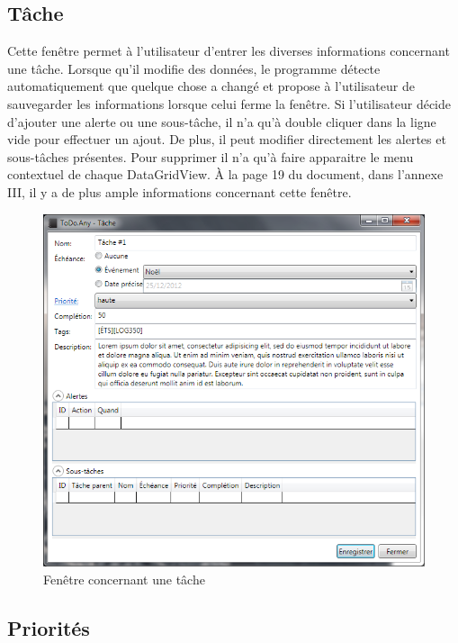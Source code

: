 \documentclass[letterpaper, oneside, 12pt, these, creativecommons]{thETS}
\begin{document}
\newpage

\subsection{Tâche}

Cette fenêtre permet à l'utilisateur d'entrer les diverses informations concernant une tâche. Lorsque qu'il modifie des données, le programme détecte automatiquement que quelque chose a changé et propose à l'utilisateur de sauvegarder les informations lorsque celui ferme la fenêtre. Si l'utilisateur décide d'ajouter une alerte ou une sous-tâche, il n'a qu'à double cliquer dans la ligne vide pour effectuer un ajout. De plus, il peut modifier directement les alertes et sous-tâches présentes. Pour supprimer il n'a qu'à faire apparaitre le menu contextuel de chaque DataGridView. À la page 19 du document, dans l'annexe III, il y a de plus ample informations concernant cette fenêtre.

\begin{figure}[H!]
	\centering
	\includegraphics[width=1\textwidth]{fenetre_tache.png}
	\caption{Fenêtre concernant une tâche}
\end{figure}

\newpage

\subsection{Priorités}
\end{document}

